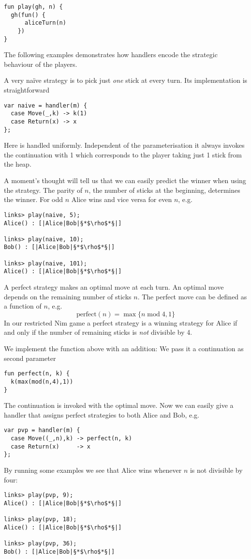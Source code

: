 \begin{lstlisting}[style=links]
fun play(gh, n) {
  gh(fun() {
      aliceTurn(n)
    })
}
\end{lstlisting}
The following examples demonstrates how handlers encode the strategic behaviour of the players.
\begin{example}\label{ex:nim-naive}
A very naïve strategy is to pick just \emph{one} stick at every turn.
Its implementation is straightforward
\begin{lstlisting}[style=links]
var naive = handler(m) {
  case Move(_,k) -> k(1)
  case Return(x) -> x
};
\end{lstlisting}
Here  is handled uniformly. Independent of the parameterisation it always invokes the continuation  with 1 which corresponds to the player taking just 1 stick from the heap.

A moment's thought will tell us that we can easily predict the winner when using the  strategy. The parity of $n$, the number of sticks at the beginning, determines the winner. For odd $n$ Alice wins and vice versa for even $n$, e.g.
\begin{lstlisting}
links> play(naive, 5);
Alice() : [|Alice|Bob|§*$\rho$*§|]

links> play(naive, 10);
Bob() : [|Alice|Bob|§*$\rho$*§|]

links> play(naive, 101);
Alice() : [|Alice|Bob|§*$\rho$*§|]
\end{lstlisting} 
\end{example}

\begin{example}\label{ex:nim-perfect}
A perfect strategy makes an optimal move at each turn. An optimal move depends on the remaining number of sticks $n$. The perfect move can be defined as a function of $n$, e.g.
\[ \text{perfect}(n) = \max\{n\; \text{mod}\; 4, 1\} \]
In our restricted Nim game a perfect strategy is a winning strategy for Alice if and only if the number of remaining sticks is \emph{not} divisible by 4.

We implement the function  above with an addition: We pass it a continuation as second parameter
\begin{lstlisting}[style=links]
fun perfect(n, k) {
  k(max(mod(n,4),1))
}
\end{lstlisting}
The continuation is invoked with the optimal move. Now we can easily give a handler that assigns perfect strategies to both Alice and Bob, e.g.
\begin{lstlisting}[style=links]
var pvp = handler(m) {
  case Move((_,n),k) -> perfect(n, k)
  case Return(x)     -> x
};
\end{lstlisting}
By running some examples we see that Alice wins whenever $n$ is not divisible by four:
\begin{lstlisting}[style=links]
links> play(pvp, 9);
Alice() : [|Alice|Bob|§*$\rho$*§|]

links> play(pvp, 18);
Alice() : [|Alice|Bob|§*$\rho$*§|]

links> play(pvp, 36);
Bob() : [|Alice|Bob|§*$\rho$*§|]
\end{lstlisting}
\end{example}

